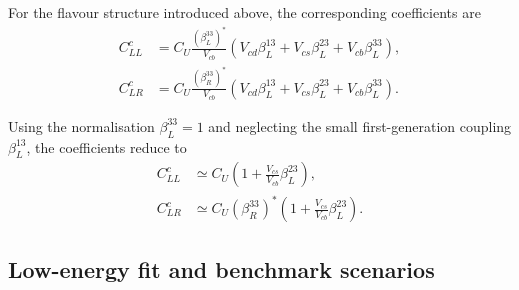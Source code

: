 For the flavour structure introduced above, the corresponding coefficients
are
\begin{align*}
    C_{LL}^{c}
    &=
    C_{U}
    \frac{
        \left(\beta_{L}^{33}\right)^{*}
    }{
        V_{cb}
    }
    \left(
        V_{cd}\beta_{L}^{13}
        +
        V_{cs}\beta_{L}^{23}
        +
        V_{cb}\beta_{L}^{33}
    \right),
    \\
    C_{LR}^{c}
    &=
    C_{U}
    \frac{
        \left(\beta_{R}^{33}\right)^{*}
    }{
        V_{cb}
    }
    \left(
        V_{cd}\beta_{L}^{13}
        +
        V_{cs}\beta_{L}^{23}
        +
        V_{cb}\beta_{L}^{33}
    \right).
\end{align*}

Using the normalisation $\beta_{L}^{33}=1$ and neglecting the small
first-generation coupling $\beta_{L}^{13}$, the coefficients reduce to
\begin{align}
    C_{LL}^{c}
    &\simeq
    C_{U}
    \left(
        1+
        \frac{V_{cs}}{V_{cb}}\beta_{L}^{23}
    \right),
    \label{eq:cll_c_approx}
    \\
    C_{LR}^{c}
    &\simeq
    C_{U}
    \left(\beta_{R}^{33}\right)^{*}
    \left(
        1+
        \frac{V_{cs}}{V_{cb}}\beta_{L}^{23}
    \right).
    \label{eq:clr_c_approx}
\end{align}

\subsection{Low-energy fit and benchmark scenarios}
\label{subsec:u1_low_energy_fit}

